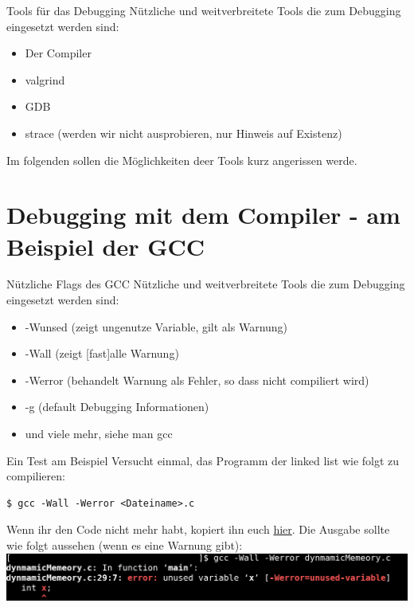 
\begin{frame}{Tools für das Debugging}
	Nützliche und weitverbreitete Tools die zum Debugging eingesetzt werden sind:
	\begin{itemize}
		\item Der Compiler
		\item valgrind
		\item GDB
		\item strace (werden wir nicht ausprobieren, nur Hinweis auf Existenz)
	\end{itemize}
	Im folgenden sollen die Möglichkeiten deer Tools kurz angerissen werde.
\end{frame}

\section{Debugging mit dem Compiler - am Beispiel der GCC}


\begin{frame}{N\"utzliche Flags des GCC}
	Nützliche und weitverbreitete Tools die zum Debugging eingesetzt werden sind:
	\begin{itemize}
		\item -Wunsed (zeigt ungenutze Variable, gilt als Warnung)
		\item -Wall (zeigt [fast]alle Warnung)
		\item -Werror (behandelt Warnung als Fehler, so dass nicht compiliert wird)
		\item -g (default Debugging Informationen) 
		\item und viele mehr, siehe man gcc
	\end{itemize}
\end{frame}

\begin{frame}[fragile]{Ein Test am Beispiel}
	Versucht einmal, das Programm der linked list wie folgt zu compilieren:
		\begin{lstlisting}[numbers=none]
$ gcc -Wall -Werror <Dateiname>.c\end{lstlisting}
Wenn ihr den Code nicht mehr habt, kopiert ihn euch \href{https://github.com/scholzp/c-lessons/blob/master/materials/memory_allocation/dynmamicMemeory.c}{hier}.
Die Ausgabe sollte wie folgt aussehen (wenn es eine Warnung gibt):
\\
\bigskip
\includegraphics[width = \linewidth]{../img/gccWerror.png}
\end{frame}

